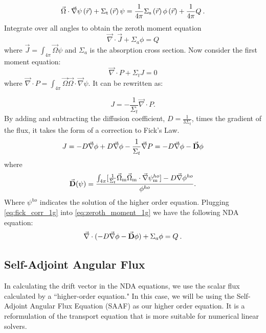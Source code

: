   \begin{equation}
  \vec{\Omega}\cdot \vec{\nabla} \psi \left(\vec{r}\right)+ \Sigma_{\mathrm{t}}\left(\vec{r}\right)\psi = \frac{1}{4 \pi} \Sigma_{\mathrm{s}}\left(\vec{r}\right) \phi\left(\vec{r}\right) + \frac{1}{4 \pi} Q\:.
  \end{equation}
Integrate over all angles to obtain the zeroth moment equation
\begin{equation}
  \vec{\nabla} \cdot \vec{J} + \Sigma_a\phi  =  Q
  \label{eq:zeroth_moment_1g}
  \end{equation}
where $\vec{J} = \int_{4\pi} \vec{\Omega}\psi$ and $\Sigma_a$ is the absorption cross section.   Now consider the first moment equation:
  \begin{equation}
  \vec{\nabla} \cdot P + \Sigma_t J = 0
  \end{equation}
where $\vec{\nabla} \cdot P =  \int_{4\pi} \vec{\Omega} \vec{\Omega} \cdot \vec{\nabla} \psi$. It can be rewritten as: 

  \begin{equation}
  J= -\frac{1}{\Sigma_t} \vec{\nabla} \cdot P. 
  \end{equation}
  By adding and subtracting the diffusion coefficient, $D = \frac{1}{3\Sigma_t}$, times the gradient of the flux, it takes the form of a correction to Fick's Law. 
  \begin{equation}
  J = -D \vec{\nabla} \phi + D \vec{\nabla} \phi - \frac{1}{\Sigma_t} \vec{\nabla} P \\
  = -D \vec{\nabla} \phi - \vec{\textbf{D}} \phi
  \label{eq:fick_corr_1g}
  \end{equation}
  where 
 \begin{equation}
  \vec{\textbf{D}} (\psi) = \frac{\int_{4\pi} [\frac{1}{\Sigma_t} \vec{\Omega}_{\mathrm{m}} \vec{\Omega}_{\mathrm{m}} \cdot \vec{\nabla}\psi^{ho}_{\mathrm{m}}] - D \vec{\nabla} \phi^{ho}}{\phi^{ho}}.
  \label{eq:drift_vector}
  \end{equation} 
Where $\psi^{ho}$ indicates the solution of the higher order equation. Plugging \eqref{eq:fick_corr_1g} into \eqref{eq:zeroth_moment_1g} we have the following NDA equation:
  \begin{equation}
  \vec{\nabla}\cdot(-D \vec{\nabla} \phi - \vec{\bf D} \phi) + \Sigma_a \phi = Q \:. \label{eq:NDA_1g}
  \end{equation}
  
 
\subsection{Self-Adjoint Angular Flux}
In calculating the drift vector in the NDA equations, we use the scalar flux calculated by a ``higher-order equation." In this case, we will be using the Self-Adjoint Angular Flux Equation (SAAF) \cite{saaf} as our higher order equation. It is a reformulation of the transport equation that is more suitable for numerical linear solvers. 

